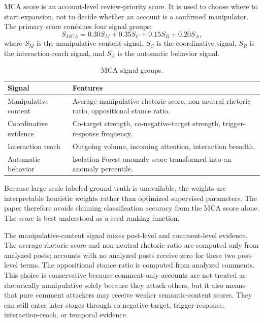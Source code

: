 \documentclass[conference]{IEEEtran}
\begin{document}
MCA score is an account-level review-priority score. It is used to choose
where to start expansion, not to decide whether an account is a confirmed
manipulator. The primary score combines four signal groups:
\begin{equation}
S_{MCA}=0.30S_M+0.35S_C+0.15S_R+0.20S_A,
\end{equation}
where $S_M$ is the manipulative-content signal, $S_C$ is the coordinative
signal, $S_R$ is the interaction-reach signal, and $S_A$ is the automatic
behavior signal.

\begin{table}[htbp]
\centering
\caption{MCA signal groups.}
\label{tab:mca}
\small
\begin{tabular}{p{}p{}}
\toprule
Signal & Features \\
\midrule
Manipulative content & Average manipulative rhetoric score, non-neutral rhetoric ratio, oppositional stance ratio. \\
Coordinative evidence & Co-target strength, co-negative-target strength, trigger-response frequency. \\
Interaction reach & Outgoing volume, incoming attention, interaction breadth. \\
Automatic behavior & Isolation Forest anomaly score transformed into an anomaly percentile. \\
\bottomrule
\end{tabular}
\end{table}

Because large-scale labeled ground truth is unavailable, the weights are
interpretable heuristic weights rather than optimized supervised parameters.
The paper therefore avoids claiming classification accuracy from the MCA score
alone. The score is best understood as a seed ranking function.

The manipulative-content signal mixes post-level and comment-level evidence.
The average rhetoric score and non-neutral rhetoric ratio are computed only
from analyzed posts; accounts with no analyzed posts receive zero for these
two post-level terms. The oppositional stance ratio is computed from analyzed
comments. This choice is conservative because comment-only accounts are not
treated as rhetorically manipulative solely because they attack others, but it
also means that pure comment attackers may receive weaker semantic-content
scores. They can still enter later stages through co-negative-target,
trigger-response, interaction-reach, or temporal evidence.
\end{document}
